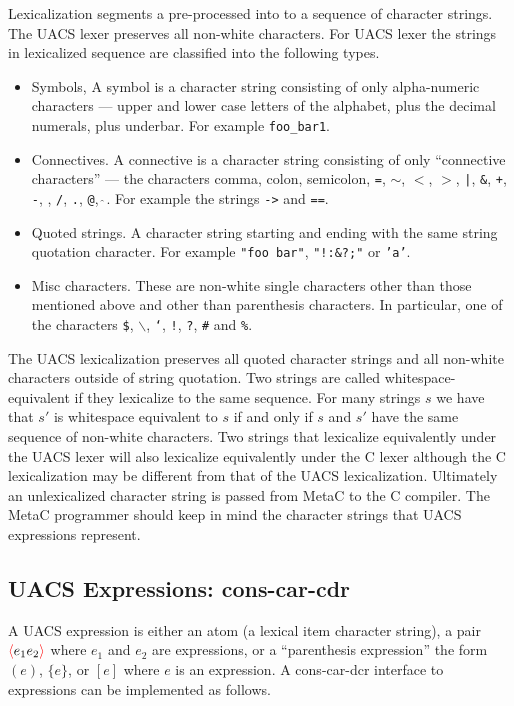 \documentclass{article}
\newcommand{\mtt}[1]{\mbox{\tt #1}}
\newcommand{\fopen}{{\color{red} \langle}}
\newcommand{\fclose}{{\color{red} \rangle}}
\begin{document}
Lexicalization segments a pre-processed into to a sequence of character strings. The UACS lexer preserves all non-white characters.  For UACS lexer the strings in lexicalized sequence are classified into
the following types.

\begin{itemize}
\item Symbols,  A symbol is a character string consisting of only alpha-numeric characters --- upper and lower case letters of the alphabet, plus the decimal numerals, plus underbar.
  For example {\tt foo\_bar1}.
\item Connectives.  A connective is a character string consisting of only ``connective characters'' --- the characters comma,
  colon, semicolon, {\tt =}, {\tt $\sim$}, {\tt $<$}, {\tt $>$}, \mtt{|}, {\tt \&}, {\tt +}, {\tt -}, {\tt *}, {\tt /}, {\tt .}, {\tt @}, \mtt{$\hat{~}$}.
  For example the strings {\tt ->} and {\tt ==}.
\item Quoted strings.  A character string starting and ending with the same string quotation character.  For example {\tt "foo bar"}, {\tt "!:\&?;"} or {\tt 'a'}.
\item Misc characters.  These are non-white single characters other than those mentioned above and other than parenthesis characters.  In particular, one of the characters
  {\tt \$}, {\tt $\backslash$}, {\tt `}, {\tt !}, {\tt ?}, {\tt \#} and {\tt \%}.
\end{itemize}


The UACS lexicalization preserves all quoted character strings and all non-white characters outside of string quotation.  Two strings are called whitespace-equivalent
if they lexicalize to the same sequence.  For many strings $s$ we have that $s'$ is whitespace equivalent to $s$ if and only if $s$ and $s'$ have the same sequence
of non-white characters.
Two strings that lexicalize equivalently under the UACS lexer will also lexicalize equivalently under the C lexer although the C lexicalization may be different from
that of the UACS lexicalization.  Ultimately an unlexicalized character string is passed from MetaC to the C compiler. The MetaC programmer should keep in mind the
character strings that UACS expressions represent.

\subsection{UACS Expressions: cons-car-cdr}

A UACS expression is either an atom (a lexical item character string),
a pair $\fopen e_1 e_2 \fclose$ where $e_1$ and $e_2$ are expressions, or a ``parenthesis expression'' the form $(e)$,
$\{ e\}$, or $[e]$ where $e$ is an expression.  A cons-car-dcr interface to expressions can be implemented as follows.
\end{document}
